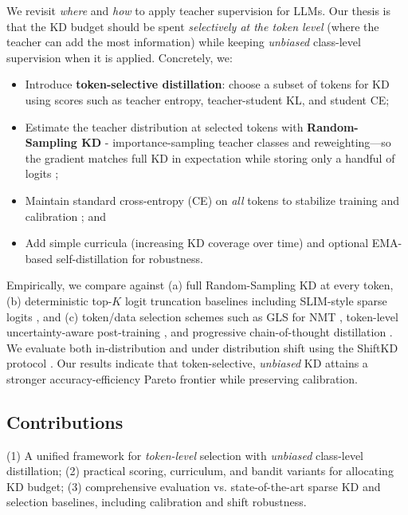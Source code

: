 \documentclass[11pt]{article}
\begin{document}
We revisit \emph{where} and \emph{how} to apply teacher supervision for LLMs. Our thesis is that the KD budget should be spent \emph{selectively at the token level} (where the teacher can add the most information) while keeping \emph{unbiased} class-level supervision when it is applied. Concretely, we:

\begin{itemize}
	\item Introduce \textbf{token-selective distillation}: choose a subset of tokens for KD using scores such as teacher entropy, teacher-student KL, and student CE;
	\item Estimate the teacher distribution at selected tokens with \textbf{Random-Sampling KD} - importance-sampling teacher classes and reweighting—so the gradient matches full KD in expectation while storing only a handful of logits \citep{anshumann2025sparse};
	\item Maintain standard cross-entropy (CE) on \emph{all} tokens to stabilize training and calibration \citep{guo2017calibration}; and
	\item Add simple curricula (increasing KD coverage over time) and optional EMA-based self-distillation for robustness.
\end{itemize}

Empirically, we compare against (a) full Random-Sampling KD at every token, (b) deterministic top-$K$ logit truncation baselines including SLIM-style sparse logits \citep{raman2023slim}, and (c) token/data selection schemes such as GLS for NMT \citep{wang2021selectivekd}, token-level uncertainty-aware post-training \citep{liu2025tokenlevel}, and progressive chain-of-thought distillation \citep{feng2024kpod}. We evaluate both in-distribution and under distribution shift using the ShiftKD protocol \citep{zhang2023shiftkd}. Our results indicate that token-selective, \emph{unbiased} KD attains a stronger accuracy-efficiency Pareto frontier while preserving calibration.

\subsection{Contributions} (1) A unified framework for \emph{token-level} selection with \emph{unbiased} class-level distillation; (2) practical scoring, curriculum, and bandit variants for allocating KD budget; (3) comprehensive evaluation vs. state-of-the-art sparse KD and selection baselines, including calibration and shift robustness.
\end{document}
